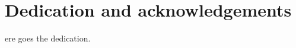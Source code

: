 %
%

\chapter*{Dedication and acknowledgements}
\begin{SingleSpace}
ere goes the dedication.
\end{SingleSpace}
\clearpage